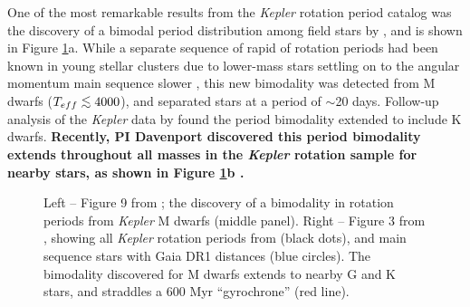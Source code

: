 \documentclass[12pt]{article}
\newcommand{\Kepler}{\textsl{Kepler}\xspace}
\def\lesssim{\mathrel{\hbox{\rlap{\hbox{\lower3pt\hbox{$\sim$}}}\hbox{\raise2pt\hbox{$<$}}}}}
\begin{document}
One of the most remarkable results from the \Kepler rotation period catalog was the discovery of a bimodal period distribution among field stars by \citet{mcquillan2013}, and is shown in Figure \ref{fig:bimodal}a. While a separate sequence of rapid of rotation periods had been known in young stellar clusters due to lower-mass stars settling on to the angular momentum main sequence slower \citep[e.g.][]{barnes2007}, this new bimodality was detected from M dwarfs ($T_{eff}\lesssim4000$), and separated stars at a period of $\sim$20 days. Follow-up analysis of the \Kepler data by \citet{mcquillan2014} found the period bimodality extended to include K dwarfs. {\bf Recently, PI Davenport discovered this period bimodality extends throughout all masses in the \Kepler rotation sample for nearby stars, as shown in Figure \ref{fig:bimodal}b \citep{davenport2017}.} %

\begin{figure}[!th]
\centering
{}
\caption{
Left -- Figure 9 from \citet{mcquillan2013}; the discovery of a bimodality in rotation periods from \Kepler M dwarfs (middle panel).
Right -- Figure 3 from \citet{davenport2017}, showing all \Kepler rotation periods from \citet{mcquillan2014} (black dots), and main sequence stars with Gaia DR1 distances (blue circles). The bimodality discovered for M dwarfs extends to nearby G and K stars, and straddles a 600 Myr ``gyrochrone'' (red line).
}
\label{fig:bimodal}
\end{figure}
\end{document}

